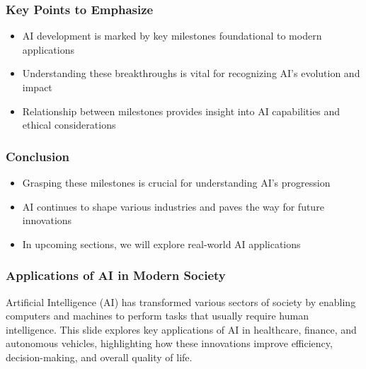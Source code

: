 \documentclass[aspectratio=169]{beamer}
\begin{document}
\begin{frame}[fragile]
    \frametitle{Key Points to Emphasize}
    \begin{itemize}
        \item AI development is marked by key milestones foundational to modern applications
        \item Understanding these breakthroughs is vital for recognizing AI's evolution and impact
        \item Relationship between milestones provides insight into AI capabilities and ethical considerations
    \end{itemize}
\end{frame}

\begin{frame}[fragile]
    \frametitle{Conclusion}
    \begin{itemize}
        \item Grasping these milestones is crucial for understanding AI's progression
        \item AI continues to shape various industries and paves the way for future innovations
        \item In upcoming sections, we will explore real-world AI applications
    \end{itemize}
\end{frame}

\begin{frame}[fragile]
    \frametitle{Applications of AI in Modern Society}
    Artificial Intelligence (AI) has transformed various sectors of society by enabling computers and machines to perform tasks that usually require human intelligence. This slide explores key applications of AI in healthcare, finance, and autonomous vehicles, highlighting how these innovations improve efficiency, decision-making, and overall quality of life.
\end{frame}
\end{document}
